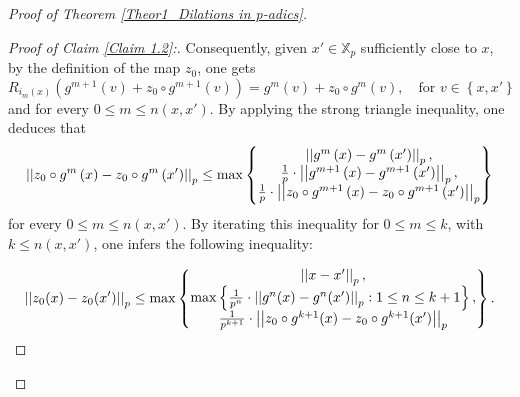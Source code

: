 \documentclass[a4paper, 12pt]{article}
\theoremstyle{definition}
\begin{document}
\begin{proof}[Proof of Theorem \ref{Theor1_Dilations in p-adics}]
\begin{proof}[Proof of Claim \ref{Claim 1.2}:]
			Consequently, given $x' \in \mathbb{X}_{p}$ sufficiently close to $x$, by the definition of the map $z_{0}$, one gets   
			$$ R_{i_{m}(x)} \left(  g^{m+1} \left(  v  \right)  + z_{0}\circ g^{m+1} \left(  v  \right)   \right)    =   g^{m} \left(  v  \right)  + z_{0}\circ g^{m} \left(  v  \right)  , \quad \text{for } v \in  \left\{  x, x' \right\}   $$
			and for every $0 \le m \le n \left(  x, x'  \right) $. 
			By applying the strong triangle inequality,  one deduces that 
			\begin{multline*} 
				\left| \left|  z_{0} \circ g^{m} \left(  x  \right)  - z_{0} \circ g^{m} \left(  x'  \right)   \right|  \right|_{p}    \le   \max  \left\{  \begin{matrix}  \left| \left|  g^{m} \left(  x  \right)  - g^{m}  \left(  x'  \right)   \right|  \right|_{p}, \\   {1\over p} \cdot  \left| \left|  g^{m+1} \left(  x  \right)  - g^{m+1} \left(  x'  \right)   \right|  \right|_{p},  \\  {1\over p}\cdot  \left| \left|  z_{0} \circ g^{m+1} \left(  x  \right)  - z_{0} \circ g^{m+1} \left(  x'  \right)   \right|  \right|_{p}  \end{matrix} \right\}  
			\end{multline*}
			for every $0 \le m \le n \left(  x, x'  \right) $. By iterating this inequality for $0\le m \le k$, with $k \le n \left(  x, x' \right) $, one infers the following inequality: 
			
			\begin{equation}\label{Eq1_Claim1.4_Continuous} 
				\left| \left|  z_{0}(x) - z_{0}(x')  \right|  \right|_{p}   \le   \max  \left\{  \begin{matrix}  \left| \left|  x- x'  \right|  \right|_{p} ,  \\  
					\max \left\{   
					{1\over p^{n} }\cdot  \left| \left|  g^{n}(x) - g^{n}(x')  \right|  \right|_{p} :   1 \le n \le k+1  \right\}   ,   \\ 
					{1\over p^{k+1}}\cdot  \left| \left|  z_{0}\circ g^{k+1}(x) - z_{0}\circ g^{k+1}(x')  \right|  \right|_{p} \end{matrix}   \right\}  .
			\end{equation}
			
			
			

\end{proof}
\end{proof}
\end{document}
